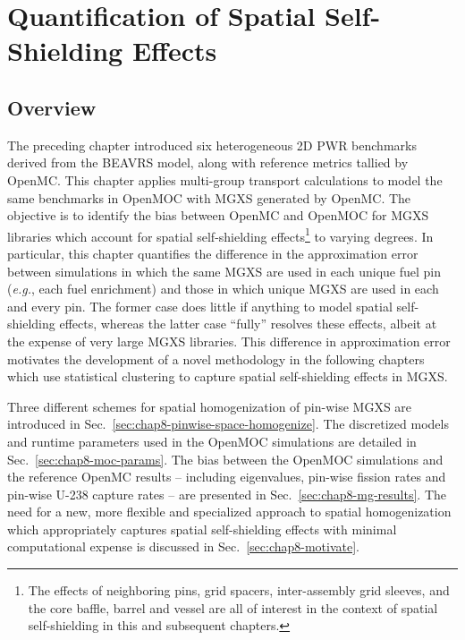 \chapter{Quantification of Spatial Self-Shielding Effects}
\label{chap:quantify}


\section{Overview}
\label{sec:chap8-overview}

The preceding chapter introduced six heterogeneous 2D \ac{PWR} benchmarks derived from the \ac{BEAVRS} model, along with reference metrics tallied by OpenMC. This chapter applies multi-group transport calculations to model the same benchmarks in OpenMOC with \ac{MGXS} generated by OpenMC. The objective is to identify the bias between OpenMC and OpenMOC for \ac{MGXS} libraries which account for spatial self-shielding effects\footnote{The effects of neighboring pins, grid spacers, inter-assembly grid sleeves, and the core baffle, barrel and vessel are all of interest in the context of spatial self-shielding in this and subsequent chapters.} to varying degrees. In particular, this chapter quantifies the difference in the approximation error between simulations in which the same \ac{MGXS} are used in each unique fuel pin (\textit{e.g.}, each fuel enrichment) and those in which unique \ac{MGXS} are used in each and every pin. The former case does little if anything to model spatial self-shielding effects, whereas the latter case ``fully'' resolves these effects, albeit at the expense of very large \ac{MGXS} libraries. This difference in approximation error motivates the development of a novel methodology in the following chapters which use statistical clustering to capture spatial self-shielding effects in \ac{MGXS}.

Three different schemes for spatial homogenization of pin-wise \ac{MGXS} are introduced in Sec.~\ref{sec:chap8-pinwise-space-homogenize}. The discretized models and runtime parameters used in the OpenMOC simulations are detailed in Sec.~\ref{sec:chap8-moc-params}. The bias between the OpenMOC simulations and the reference OpenMC results -- including eigenvalues, pin-wise fission rates and pin-wise U-238 capture rates -- are presented in Sec.~\ref{sec:chap8-mg-results}. The need for a new, more flexible and specialized approach to spatial homogenization which appropriately captures spatial self-shielding effects with minimal computational expense is discussed in Sec.~\ref{sec:chap8-motivate}.


